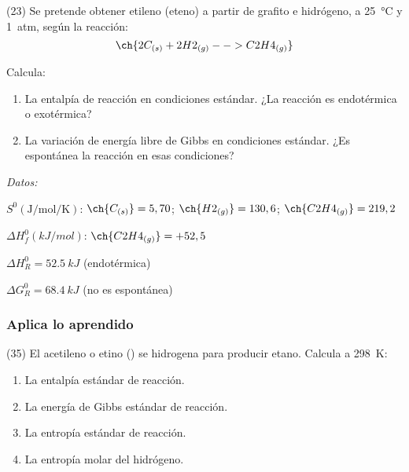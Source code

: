 \documentclass[10pt]{article}
\newenvironment{gexdatos}{
      \vspace{2pt}\noindent\textit{Datos: }
    }{\vspace{5pt}}
\begin{document}
\begin{multicols}{2}
\begin{exercise}[
    tags    = {},
    topics  = {química, termodinámica, termoquímica},
    source  = {FQ 1B MGH 2016, p181, e23},
  ]
  (23) Se pretende obtener etileno (eteno) a partir de grafito e
  hidrógeno, a \SI{25}{\celsius} y \SI{1}{atm}, según la reacción:
  \[  \ch{2 C_{(s)} + 2 H2_{(g)} --> C2H4_{(g)}} \]

  Calcula:

  \begin{enumerate}
    \item La entalpía de reacción en condiciones estándar. ¿La reacción es endotérmica o exotérmica?
    \item La variación de energía libre de Gibbs en condiciones
    estándar. ¿Es espontánea la reacción en esas condiciones?
  \end{enumerate}

  \begin{gexdatos}
    \( S^0 (\si{\joule\per\mole\per\kelvin}) \):
    \( \ch{C_{(s)}} = 5,70 \);
    \( \ch{H2_{(g)}} = 130,6 \);
    \( \ch{C2H4_{(g)}}= 219,2 \)

    \( \Delta H^0_f (\si{kJ/mol}) \):
    \( \ch{C2H4_{(g)}} = +52,5 \)
  \end{gexdatos}
\end{exercise}

\begin{solution}
  \begin{enumerate*}
    \item \( \Delta H^0_R = \SI{+52.5}{kJ} \) (endotérmica)
    \item \( \Delta G^0_R = \SI{+68.4}{kJ} \) (no es espontánea)
  \end{enumerate*}
\end{solution}






\subsubsection{Aplica lo aprendido}

\begin{exercise}[
    tags    = {},
    topics  = {química, termodinámica, termoquímica},
    source  = {FQ 1B MGH 2016, p182, e35},
  ]
  (35) El acetileno o etino () se hidrogena para producir etano. Calcula a \SI{298}{\kelvin}:

  \begin{enumerate}
    \item La entalpía estándar de reacción.
    \item La energía de Gibbs estándar de reacción.
    \item La entropía estándar de reacción.
    \item La entropía molar del hidrógeno.
  \end{enumerate}


\end{exercise}
\end{multicols}
\end{document}

